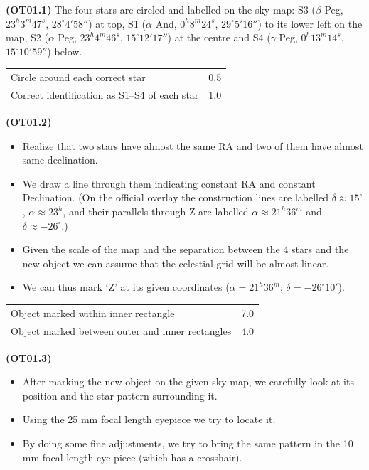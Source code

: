 \textbf{(OT01.1)} The four stars are circled and labelled on the sky map:
S3 ($\beta$ Peg, $23^h3^m47^s$, $28^\circ4'58''$) at top, S1 ($\alpha$ And,
$0^h8^m24^s$, $29^\circ5'16''$) to its lower left on the map, S2
($\alpha$ Peg, $23^h4^m46^s$, $15^\circ12'17''$) at the centre and S4
($\gamma$ Peg, $0^h13^m14^s$, $15^\circ10'59''$) below.


\begin{center}
\begin{tabular}{l r}
\hline
Circle around each correct star & 0.5 \\
Correct identification as S1--S4 of each star & 1.0 \\
\hline
\end{tabular}
\end{center}

\textbf{(OT01.2)}
\begin{itemize}
\item Realize that two stars have almost the same RA and two of them have
  almost same declination.
\item We draw a line through them indicating constant RA and constant
  Declination. (On the official overlay the construction lines are labelled
  $\delta \approx 15^\circ$, $\alpha \approx 23^h$, and their parallels
  through Z are labelled $\alpha \approx 21^h36^m$ and
  $\delta \approx -26^\circ$.)
\item Given the scale of the map and the separation between the 4 stars and
  the new object we can assume that the celestial grid will be almost
  linear.
\item We can thus mark `Z' at its given coordinates
  ($\alpha = 21^h36^m$; $\delta = -26^\circ10'$).
\end{itemize}

\begin{center}
\begin{tabular}{l r}
\hline
Object marked within inner rectangle & 7.0 \\
\quad Object marked between outer and inner rectangles & 4.0 \\
\hline
\end{tabular}
\end{center}

\textbf{(OT01.3)}
\begin{itemize}
\item After marking the new object on the given sky map, we carefully look
  at its position and the star pattern surrounding it.
\item Using the 25 mm focal length eyepiece we try to locate it.
\item By doing some fine adjustments, we try to bring the same pattern in
  the 10 mm focal length eye piece (which has a crosshair).
\end{itemize}

